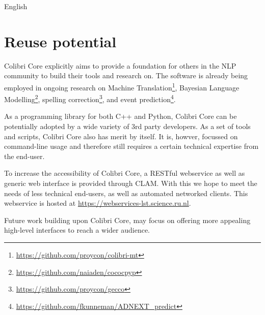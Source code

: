 \documentclass[a4paper,12pt]{article}
\begin{document}
English


\section{Reuse potential}

Colibri Core explicitly aims to provide a foundation for others in the NLP
community to build their tools and research on. The software is already being
employed in ongoing research on Machine
Translation\footnote{\url{https://github.com/proycon/colibri-mt}}, Bayesian Language
Modelling\footnote{\url{https://github.com/naiaden/cococpyp}}, spelling
correction\footnote{\url{https://github.com/proycon/gecco}}, and event
prediction\footnote{\url{https://github.com/fkunneman/ADNEXT\_predict}}.

As a programming library for both C++ and Python, Colibri Core can be
potentially adopted by a wide variety of 3rd party developers. As a set of
tools and scripts, Colibri Core also has merit by itself. It is, howver,
focussed on command-line usage and therefore still requires a certain technical
expertise from the end-user.

To increase the accessibility of Colibri Core, a RESTful webservice as well as
generic web interface is provided through CLAM\cite{CLAMPAPER}. With this we
hope to meet the needs of less technical end-users, as well as automated
networked clients. This webservice is hosted at
\url{https://webservices-lst.science.ru.nl}.

Future work building upon Colibri Core, may focus on offering more appealing
high-level interfaces to reach a wider audience.





\end{document}
